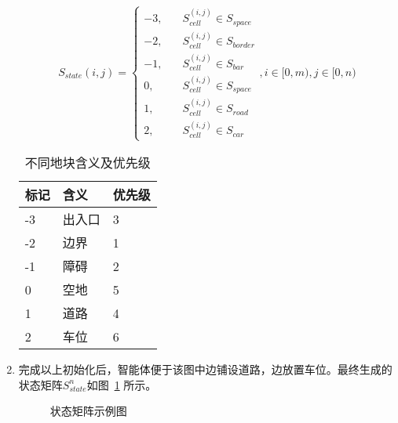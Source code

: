 \begin{enumerate}
          \begin{equation}
              \label{state}
              S_{state}(i,j)=\left\{
              \begin{array}{ll}
                  -3, \quad & S_{cell}^{(i,j)} \in S_{space}  \\
                  -2,       & S_{cell}^{(i,j)} \in S_{border} \\
                  -1,       & S_{cell}^{(i,j)} \in S_{bar}    \\
                  0,        & S_{cell}^{(i,j)} \in S_{space}  \\
                  1,        & S_{cell}^{(i,j)} \in S_{road}   \\
                  2,        & S_{cell}^{(i,j)} \in S_{car}
              \end{array}
              \right.,i \in [0,m), j \in [0,n)
          \end{equation}
          \begin{table}[!htb]
              \caption{不同地块含义及优先级}
              \label{tab:diff_sqaure}
              \centering
              \linespread{1.25}\selectfont
              \begin{tabular}{C{1cm} C{1.5cm} C{1.5cm}}
                  \hline
                  标记 & 含义  & 优先级 \\
                   & 出入口 & 3   \\
                  -2 & 边界  & 1   \\
                  -1 & 障碍  & 2   \\
                  0  & 空地  & 5   \\
                  1  & 道路  & 4   \\
                  2  & 车位  & 6   \\
                  \hline
                  
              \end{tabular}
          \end{table}
    \item 完成以上初始化后，智能体便于该图中边铺设道路，边放置车位。最终生成的状态矩阵$S_{state}^n$如图~\ref{fig:matrix_exam} 所示。
          \begin{figure}[!htb]
              \centering
              
              \caption{状态矩阵示例图}
              \label{fig:matrix_exam}
          \end{figure}
\end{enumerate}
